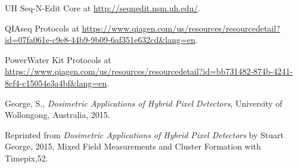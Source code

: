 \begin{thebibliography}{9}
  UH Seq-N-Edit Core at \url{http://seqnedit.nsm.uh.edu/}.
  
  QIAseq Protocols at \url{https://www.qiagen.com/us/resources/resourcedetail?id=07fa061e-c9e8-44b9-9b09-6af351e632cd&lang=en}.  

  PowerWater Kit Protocols at \url{https://www.qiagen.com/us/resources/resourcedetail?id=bb731482-874b-4241-8cf4-c15054e3a4bf&lang=en}.  
  
  George, S., \textit{Dosimetric Applications of Hybrid Pixel Detectors}, University of Wollongong, Australia, 2015.

  Reprinted from \textit{Dosimetric Applications of Hybrid Pixel Detectors} by Stuart George, 2015, Mixed Field Measurements and Cluster Formation with Timepix,52.


  


	





\end{thebibliography}
